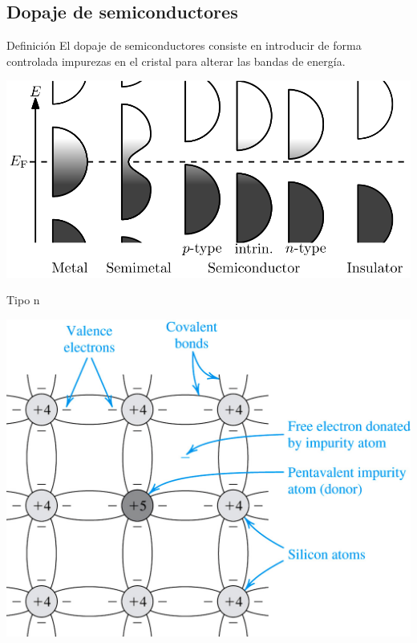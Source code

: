 \documentclass[xcolor={usenames,svgnames,dvipsnames}]{beamer}
\begin{document}
\subsection{Dopaje de semiconductores}
\label{sec:org1f17d10}
\begin{frame}[label={sec:org2612054}]{Definición}
El \alert{dopaje de semiconductores} consiste en introducir de forma controlada impurezas en el cristal para alterar las bandas de energía.

\begin{center}
\includegraphics[width=.9\linewidth]{../figs/Band_filling_diagram.png}
\end{center}
\end{frame}


\begin{frame}[label={sec:org3ccaf71}]{Tipo n}
\begin{center}
\includegraphics[width=.9\linewidth]{../figs/DopajeN.jpg}
\end{center}
\end{frame}
\end{document}
